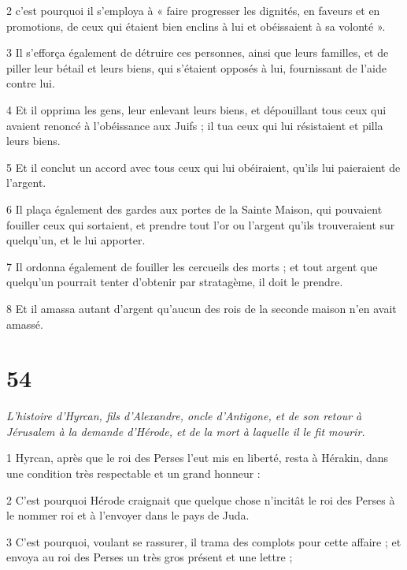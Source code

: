 \par 2 c'est pourquoi il s'employa à « faire progresser les dignités, en faveurs et en promotions, de ceux qui étaient bien enclins à lui et obéissaient à sa volonté ».

\par 3 Il s'efforça également de détruire ces personnes, ainsi que leurs familles, et de piller leur bétail et leurs biens, qui s'étaient opposés à lui, fournissant de l'aide contre lui.

\par 4 Et il opprima les gens, leur enlevant leurs biens, et dépouillant tous ceux qui avaient renoncé à l'obéissance aux Juifs ; il tua ceux qui lui résistaient et pilla leurs biens.

\par 5 Et il conclut un accord avec tous ceux qui lui obéiraient, qu'ils lui paieraient de l'argent.

\par 6 Il plaça également des gardes aux portes de la Sainte Maison, qui pouvaient fouiller ceux qui sortaient, et prendre tout l'or ou l'argent qu'ils trouveraient sur quelqu'un, et le lui apporter.

\par 7 Il ordonna également de fouiller les cercueils des morts ; et tout argent que quelqu'un pourrait tenter d'obtenir par stratagème, il doit le prendre.

\par 8 Et il amassa autant d'argent qu'aucun des rois de la seconde maison n'en avait amassé.

\chapter{54}

\par \textit{L'histoire d'Hyrcan, fils d'Alexandre, oncle d'Antigone, et de son retour à Jérusalem à la demande d'Hérode, et de la mort à laquelle il le fit mourir.}

\par 1 Hyrcan, après que le roi des Perses l'eut mis en liberté, resta à Hérakin, dans une condition très respectable et un grand honneur :

\par 2 C'est pourquoi Hérode craignait que quelque chose n'incitât le roi des Perses à le nommer roi et à l'envoyer dans le pays de Juda.

\par 3 C'est pourquoi, voulant se rassurer, il trama des complots pour cette affaire ; et envoya au roi des Perses un très gros présent et une lettre ;

